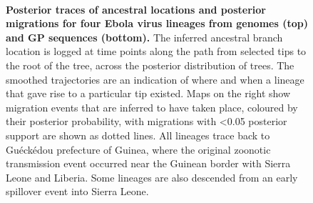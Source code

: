 \documentclass[11pt,oneside,letterpaper]{article}
\begin{document}
\begin{figure}[h]
 \centering
  \\
  \caption{\textbf{Posterior traces of ancestral locations and posterior migrations for four Ebola virus lineages from genomes (top) and GP sequences (bottom).}
  The inferred ancestral branch location is logged at time points along the path from selected tips to the root of the tree, across the posterior distribution of trees.
  The smoothed trajectories are an indication of where and when a lineage that gave rise to a particular tip existed.
  Maps on the right show migration events that are inferred to have taken place, coloured by their posterior probability, with migrations with <0.05 posterior support are shown as dotted lines.
  All lineages trace back to Gu\'{e}ck\'{e}dou prefecture of Guinea, where the original zoonotic transmission event occurred near the Guinean border with Sierra Leone and Liberia.
  Some lineages are also descended from an early spillover event into Sierra Leone.
  }
	\label{trace}
\end{figure}
\end{document}

